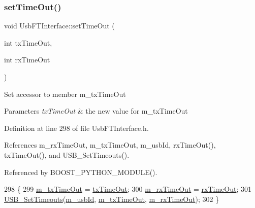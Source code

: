 \subsubsection{\texorpdfstring{set\+Time\+Out()}{setTimeOut()}}
{\footnotesize\ttfamily void Usb\+F\+T\+Interface\+::set\+Time\+Out (\begin{DoxyParamCaption}\item[{int}]{tx\+Time\+Out,  }\item[{int}]{rx\+Time\+Out }\end{DoxyParamCaption})\hspace{0.3cm}{\ttfamily [inline]}}

Set accessor to member m\+\_\+tx\+Time\+Out 
\begin{DoxyParams}{Parameters}
{\em tx\+Time\+Out} & the new value for m\+\_\+tx\+Time\+Out \\
\hline
\end{DoxyParams}


Definition at line 298 of file Usb\+F\+T\+Interface.\+h.



References m\+\_\+rx\+Time\+Out, m\+\_\+tx\+Time\+Out, m\+\_\+usb\+Id, rx\+Time\+Out(), tx\+Time\+Out(), and U\+S\+B\+\_\+\+Set\+Timeouts().



Referenced by B\+O\+O\+S\+T\+\_\+\+P\+Y\+T\+H\+O\+N\+\_\+\+M\+O\+D\+U\+L\+E().


\begin{DoxyCode}
298                                                 \{
299     \hyperlink{classUsbFTInterface_af88e498a8ed759e35ae9e94f74ffcf56}{m\_txTimeOut} = \hyperlink{classUsbFTInterface_acab2397cb42003a1ed8f69a0c6cae195}{txTimeOut};
300     \hyperlink{classUsbFTInterface_a0153d99857eaa634e4b9fc1ec58caf52}{m\_rxTimeOut} = \hyperlink{classUsbFTInterface_ad95ffb87539ca86882e26fa24b00de97}{rxTimeOut};
301     \hyperlink{LALUsbML_8h_a217702d9c80d1bb65ce8703c0a7382fa}{USB\_SetTimeouts}(\hyperlink{classUsbFTInterface_a91df5c0547e8be460bc087e27afe05aa}{m\_usbId}, \hyperlink{classUsbFTInterface_af88e498a8ed759e35ae9e94f74ffcf56}{m\_txTimeOut}, 
      \hyperlink{classUsbFTInterface_a0153d99857eaa634e4b9fc1ec58caf52}{m\_rxTimeOut});
302   \}
\end{DoxyCode}
\mbox{\label{classObject_a89557dbbad5bcaa02652f5d7fa35d20f}} 
